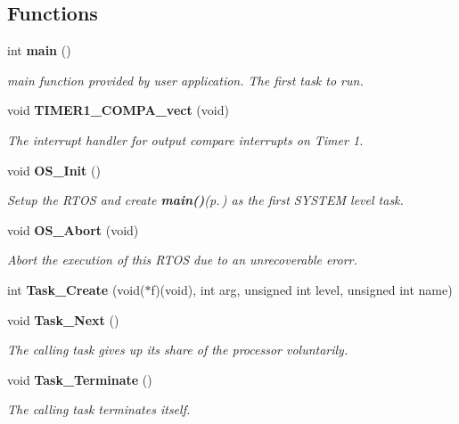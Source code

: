 \subsection*{Functions}
\begin{CompactItemize}
\item 
int {\bf main} ()
\begin{CompactList}\small\item\em main function provided by user application. The first task to run. \item\end{CompactList}\item 
void {\bf TIMER1\_\-COMPA\_\-vect} (void)
\begin{CompactList}\small\item\em The interrupt handler for output compare interrupts on Timer 1. \item\end{CompactList}\item 
void {\bf OS\_\-Init} ()
\begin{CompactList}\small\item\em Setup the RTOS and create {\bf main()}{\rm (p.\,\pageref{_assignment2_8c_840291bc02cba5474a4cb46a9b9566fe})} as the first SYSTEM level task. \item\end{CompactList}\item 
void {\bf OS\_\-Abort} (void)
\begin{CompactList}\small\item\em Abort the execution of this RTOS due to an unrecoverable erorr. \item\end{CompactList}\item 
int {\bf Task\_\-Create} (void($\ast$f)(void), int arg, unsigned int level, unsigned int name)
\item 
void {\bf Task\_\-Next} ()
\begin{CompactList}\small\item\em The calling task gives up its share of the processor voluntarily. \item\end{CompactList}\item 
void {\bf Task\_\-Terminate} ()
\begin{CompactList}\small\item\em The calling task terminates itself. \item\end{CompactList}\item 

\end{CompactItemize}
